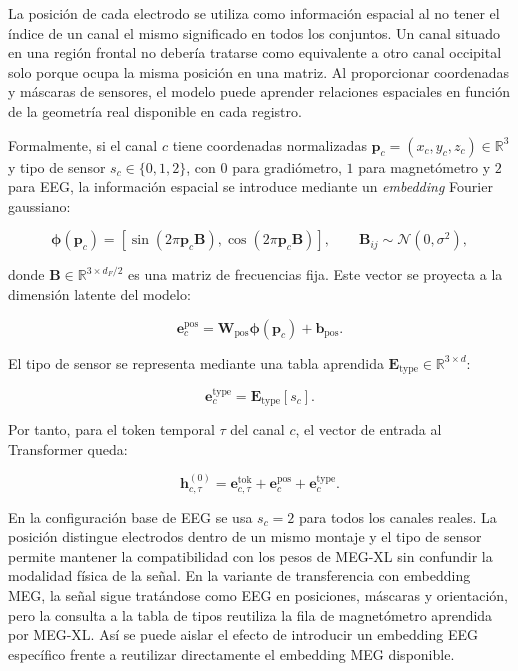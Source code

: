 La posición de cada electrodo se utiliza como información espacial al no tener el índice de un canal el mismo significado en todos los conjuntos. Un canal situado en una región frontal no debería tratarse como equivalente a otro canal occipital solo porque ocupa la misma posición en una matriz. Al proporcionar coordenadas y máscaras de sensores, el modelo puede aprender relaciones espaciales en función de la geometría real disponible en cada registro.

Formalmente, si el canal \(c\) tiene coordenadas normalizadas \(\mathbf{p}_c=(x_c,y_c,z_c)\in\mathbb{R}^3\) y tipo de sensor \(s_c\in\{0,1,2\}\), con \(0\) para gradiómetro, \(1\) para magnetómetro y \(2\) para EEG, la información espacial se introduce mediante un \textit{embedding} Fourier gaussiano:

\begin{equation}
\boldsymbol{\phi}(\mathbf{p}_c)=
\left[
\sin\left(2\pi \mathbf{p}_c \mathbf{B}\right),
\cos\left(2\pi \mathbf{p}_c \mathbf{B}\right)
\right],
\qquad
\mathbf{B}_{ij}\sim\mathcal{N}(0,\sigma^2),
\end{equation}

\noindent donde \(\mathbf{B}\in\mathbb{R}^{3\times d_F/2}\) es una matriz de frecuencias fija. Este vector se proyecta a la dimensión latente del modelo:

\begin{equation}
\mathbf{e}^{\text{pos}}_c =
\mathbf{W}_{\text{pos}}\boldsymbol{\phi}(\mathbf{p}_c)
+ \mathbf{b}_{\text{pos}}.
\end{equation}

El tipo de sensor se representa mediante una tabla aprendida \(\mathbf{E}_{\text{type}}\in\mathbb{R}^{3\times d}\):

\begin{equation}
\mathbf{e}^{\text{type}}_c =
\mathbf{E}_{\text{type}}[s_c].
\end{equation}

Por tanto, para el token temporal \(\tau\) del canal \(c\), el vector de entrada al Transformer queda:

\begin{equation}
\mathbf{h}^{(0)}_{c,\tau} =
\mathbf{e}^{\text{tok}}_{c,\tau}
+ \mathbf{e}^{\text{pos}}_c
+ \mathbf{e}^{\text{type}}_c.
\end{equation}

En la configuración base de EEG se usa \(s_c=2\) para todos los canales reales. La posición distingue electrodos dentro de un mismo montaje y el tipo de sensor permite mantener la compatibilidad con los pesos de MEG-XL sin confundir la modalidad física de la señal. En la variante de transferencia con embedding MEG, la señal sigue tratándose como EEG en posiciones, máscaras y orientación, pero la consulta a la tabla de tipos reutiliza la fila de magnetómetro aprendida por MEG-XL. Así se puede aislar el efecto de introducir un embedding EEG específico frente a reutilizar directamente el embedding MEG disponible.

